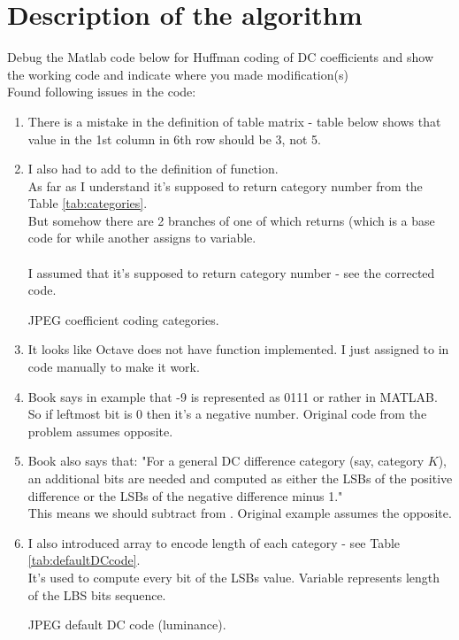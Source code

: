 \documentclass[14pt, letterpaper]{article}
\begin{document}
\section{Description of the algorithm}
Debug the Matlab code below for Huffman coding of DC coefficients and show the working code
and indicate where you made modification(s)
%
\\Found following issues in the code:
\begin{enumerate}
	\item There is a mistake in the definition of table matrix - table below shows that value in the 1st column in 6th row should be 3, not 5.\\
	\item I also had to add  to the definition of  function.\\
	As far as I understand it's supposed to return category number from the Table \ref{tab:categories}.\\
	But somehow there are 2 branches of  one of which returns \mcode{[0 1 0]} (which is a base code for  while another assigns  to  variable.\\\\I assumed that it's supposed to return category number - see the corrected code.\\
	\begin{table}[!htbp]
		\centering
		\caption{JPEG coefficient coding categories.}
		\label{tab:categories}
	\end{table}
	\item It looks like Octave does not have  function implemented. I just assigned  to \mcode{[0 1 1 1]} in code manually to make it work.
	\item Book says in example that -9 is represented as 0111 or rather \mcode{[0 1 1 1]} in MATLAB. So if leftmost bit is 0 then it's a negative number. Original code from the problem assumes opposite.
	\item Book also says that: "For a general DC difference category (say, category $K$), an additional bits are needed and computed as either
	the LSBs of the positive difference or the LSBs of the negative difference minus 1."\\
	This means we should subtract  from . Original example assumes the opposite.
	\item I also introduced  array to encode length of each category - see Table \ref{tab:defaultDCcode}.\\
	It's used to compute every bit of the LSBs value. Variable  represents length of the LBS bits sequence.
	\begin{table}[!htbp]
		\centering
		\caption{JPEG default DC code (luminance).}
		\label{tab:defaultDCcode}
	\end{table}
\end{enumerate}
\end{document}
